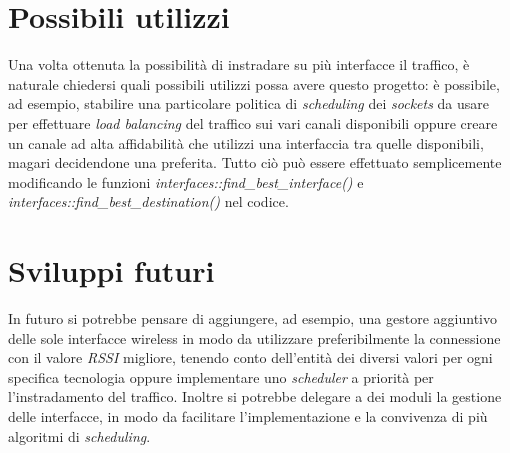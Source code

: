 \section{Possibili utilizzi}
Una volta ottenuta la possibilità di instradare su più interfacce il traffico, è naturale chiedersi quali possibili utilizzi possa avere questo progetto:
è possibile, ad esempio, stabilire una particolare politica di {\em scheduling} dei {\em sockets} da usare per effettuare {\em load balancing} del traffico sui vari canali disponibili oppure creare un canale ad alta affidabilità che utilizzi una interfaccia tra quelle disponibili, magari decidendone una preferita. Tutto ciò può essere effettuato semplicemente modificando le funzioni {\em interfaces::find\_best\_interface()} e {\em interfaces::find\_best\_destination()} nel codice.
\section{Sviluppi futuri}
In futuro si potrebbe pensare di aggiungere, ad esempio, una gestore aggiuntivo delle sole interfacce wireless in modo da utilizzare preferibilmente la connessione con il valore {\em RSSI} migliore, tenendo conto dell'entità dei diversi valori per ogni specifica tecnologia oppure implementare uno {\em scheduler} a priorità per l'instradamento del traffico. Inoltre si potrebbe delegare a dei moduli la gestione delle interfacce, in modo da facilitare l'implementazione e la convivenza di più algoritmi di {\em scheduling}.
